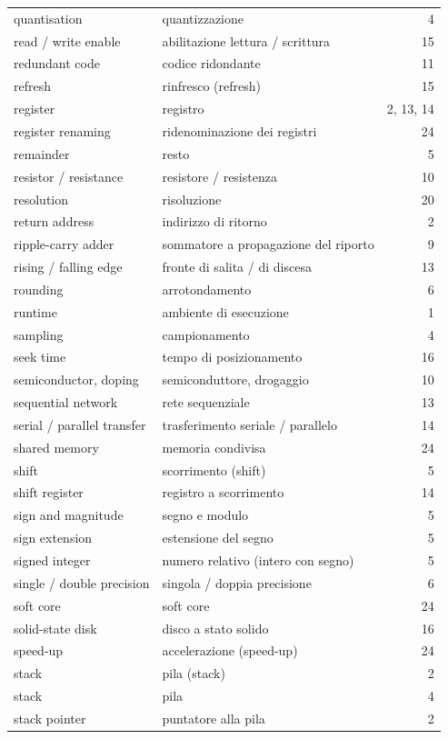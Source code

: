 {\begin{longtable}{@{}p{}p{}r@{}}
quantisation & quantizzazione & 4\\
read / write enable & abilitazione lettura / scrittura & 15\\
redundant code & codice ridondante & 11\\
refresh & rinfresco (refresh) & 15\\
register & registro & 2, 13, 14\\
register renaming & ridenominazione dei registri & 24\\
remainder & resto & 5\\
resistor / resistance & resistore / resistenza & 10\\
resolution & risoluzione & 20\\
return address & indirizzo di ritorno & 2\\
ripple-carry adder & sommatore a propagazione del riporto & 9\\
rising / falling edge & fronte di salita / di discesa & 13\\
rounding & arrotondamento & 6\\
runtime & ambiente di esecuzione & 1\\
sampling & campionamento & 4\\
seek time & tempo di posizionamento & 16\\
semiconductor, doping & semiconduttore, drogaggio & 10\\
sequential network & rete sequenziale & 13\\
serial / parallel transfer & trasferimento seriale / parallelo & 14\\
shared memory & memoria condivisa & 24\\
shift & scorrimento (shift) & 5\\
shift register & registro a scorrimento & 14\\
sign and magnitude & segno e modulo & 5\\
sign extension & estensione del segno & 5\\
signed integer & numero relativo (intero con segno) & 5\\
single / double precision & singola / doppia precisione & 6\\
soft core & soft core & 24\\
solid-state disk & disco a stato solido & 16\\
speed-up & accelerazione (speed-up) & 24\\
stack & pila (stack) & 2\\
stack & pila & 4\\
stack pointer & puntatore alla pila & 2\\

\end{longtable}}
